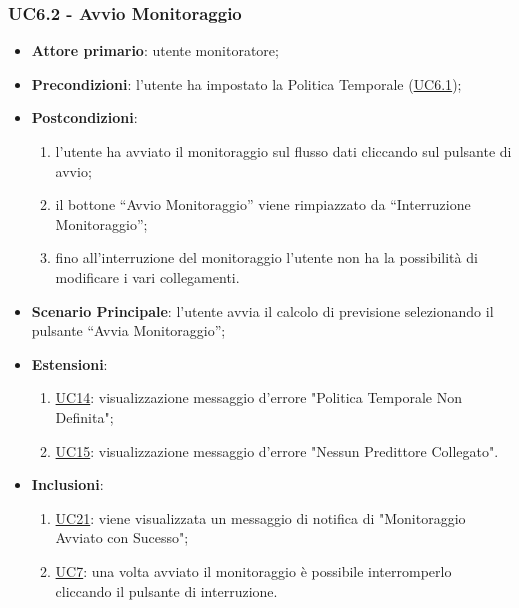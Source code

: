 	\subsubsection{UC6.2 - Avvio Monitoraggio}
		\begin{itemize}
			\item\textbf{Attore primario}: utente monitoratore;
			\item\textbf{Precondizioni}: l’utente ha impostato la Politica Temporale (\hyperref[par:UC6.1]{UC6.1});
			\item\textbf{Postcondizioni}: 
				\begin{enumerate}
					\item l’utente ha avviato il monitoraggio sul flusso dati cliccando sul pulsante di avvio;
					\item il bottone “Avvio Monitoraggio” viene rimpiazzato da “Interruzione Monitoraggio”;
					\item fino all’interruzione del monitoraggio l’utente non ha la possibilità di modificare i vari collegamenti.
				\end{enumerate}
			\item\textbf{Scenario Principale}: l’utente avvia il calcolo di previsione selezionando il pulsante “Avvia Monitoraggio”; 
			\item\textbf{Estensioni}: 
				\begin{enumerate} 
					\item \hyperref[par:UC14]{UC14}: visualizzazione messaggio d’errore "Politica Temporale Non Definita";
					\item \hyperref[par:UC15]{UC15}: visualizzazione messaggio d’errore "Nessun Predittore Collegato".
				\end{enumerate}
			\item\textbf{Inclusioni}: 
				\begin{enumerate} 
					\item \hyperref[par:UC21]{UC21}: viene visualizzata un messaggio di notifica di "Monitoraggio Avviato con Sucesso";
					\item \hyperref[par:UC7]{UC7}: una volta avviato il monitoraggio è possibile interromperlo cliccando il pulsante di interruzione.
				\end{enumerate}	
		\end{itemize}	

	\label{par:UC6.3}
